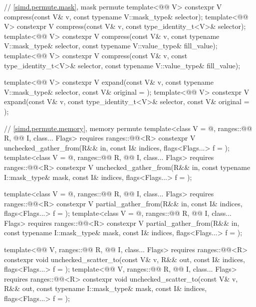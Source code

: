 \begin{codeblock}
{  // \ref{simd.permute.mask}, mask permute
  template<@@ V>
    constexpr V compress(const V& v, const typename V::mask_type& selector);
  template<@@ V>
    constexpr V compress(const V& v, const type_identity_t<V>& selector);
  template<@@ V>
    constexpr V compress(const V& v, const typename V::mask_type& selector,
                         const typename V::value_type& fill_value);
  template<@@ V>
    constexpr V compress(const V& v, const type_identity_t<V>& selector,
                         const typename V::value_type& fill_value);

  template<@@ V>
    constexpr V expand(const V& v, const typename V::mask_type& selector,
                       const V& original = {});
  template<@@ V>
    constexpr V expand(const V& v, const type_identity_t<V>& selector,
                       const V& original = {});

  // \ref{simd.permute.memory}, memory permute
  template<class V = @\seebelow@, ranges::@@ R, @@ I, class... Flags>
    requires ranges::@@<R>
    constexpr V unchecked_gather_from(R&& in, const I& indices, flags<Flags...> f = {});
  template<class V = @\seebelow@, ranges::@@ R, @@ I, class... Flags>
    requires ranges::@@<R>
    constexpr V unchecked_gather_from(R&& in, const typename I::mask_type& mask,
                                      const I& indices, flags<Flags...> f = {});

  template<class V = @\seebelow@, ranges::@@ R, @@ I, class... Flags>
    requires ranges::@@<R>
    constexpr V partial_gather_from(R&& in, const I& indices, flags<Flags...> f = {});
  template<class V = @\seebelow@, ranges::@@ R, @@ I, class... Flags>
    requires ranges::@@<R>
    constexpr V partial_gather_from(R&& in, const typename I::mask_type& mask,
                                    const I& indices, flags<Flags...> f = {});

  template<@@ V, ranges::@@ R, @@ I, class... Flags>
    requires ranges::@@<R>
    constexpr void unchecked_scatter_to(const V& v, R&& out,
                                        const I& indices, flags<Flags...> f = {});
  template<@@ V, ranges::@@ R, @@ I, class... Flags>
    requires ranges::@@<R>
    constexpr void unchecked_scatter_to(const V& v, R&& out, const typename I::mask_type& mask,
                                        const I& indices, flags<Flags...> f = {});

}
\end{codeblock}
